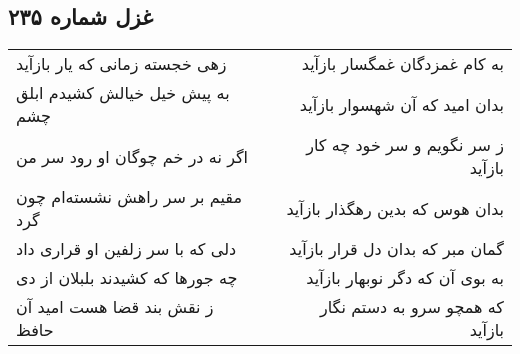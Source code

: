 \begin{center}
\section*{غزل شماره ۲۳۵}
\label{sec:sh235}
\begin{longtable}{l p{0.5cm} r}
زهی خجسته زمانی که یار بازآید
&&
به کام غمزدگان غمگسار بازآید
\\
به پیش خیل خیالش کشیدم ابلق چشم
&&
بدان امید که آن شهسوار بازآید
\\
اگر نه در خم چوگان او رود سر من
&&
ز سر نگویم و سر خود چه کار بازآید
\\
مقیم بر سر راهش نشسته‌ام چون گرد
&&
بدان هوس که بدین رهگذار بازآید
\\
دلی که با سر زلفین او قراری داد
&&
گمان مبر که بدان دل قرار بازآید
\\
چه جورها که کشیدند بلبلان از دی
&&
به بوی آن که دگر نوبهار بازآید
\\
ز نقش بند قضا هست امید آن حافظ
&&
که همچو سرو به دستم نگار بازآید
\\
\end{longtable}
\end{center}

